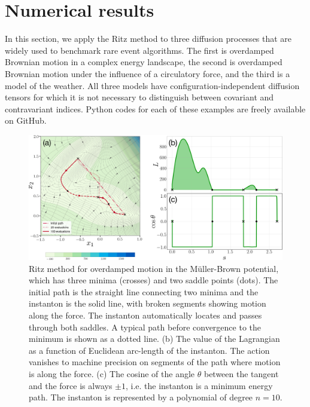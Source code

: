 \section{Numerical results} \label{sec:pyritz-applications}

In this section, we apply the Ritz method to three diffusion processes
that are widely used to benchmark rare event algorithms. The first
is overdamped Brownian motion in a complex energy landscape, the second
is overdamped Brownian motion under the influence of a circulatory
force, and the third is a model of the weather. All three models have
configuration-independent diffusion tensors for which it is not necessary
to distinguish between covariant and contravariant indices. Python
codes for each of these examples are freely available on GitHub. 
\begin{figure}[t]
\begin{centering}
\includegraphics[width=0.94\linewidth]{figs_part1/pyritz/fig1.jpeg}
\par\end{centering}
\caption{Ritz method for overdamped motion in the Müller-Brown potential, which
has three minima (crosses) and two saddle points (dots). The initial
path is the straight line connecting two minima and the instanton
is the solid line, with broken segments showing motion along the force.
The instanton automatically locates and passes through both saddles.
A typical path before convergence to the minimum is shown as a dotted
line. (b) The value of the Lagrangian as a function of Euclidean arc-length
of the instanton. The action vanishes to machine precision on segments
of the path where motion is along the force. (c) The cosine of the
angle $\theta$ between the tangent and the force is always $\pm1$,
i.e. the instanton is a minimum energy path. The instanton is represented
by a polynomial of degree $n=10$. }

\label{fig:muller-brown-instanton}
\end{figure}


